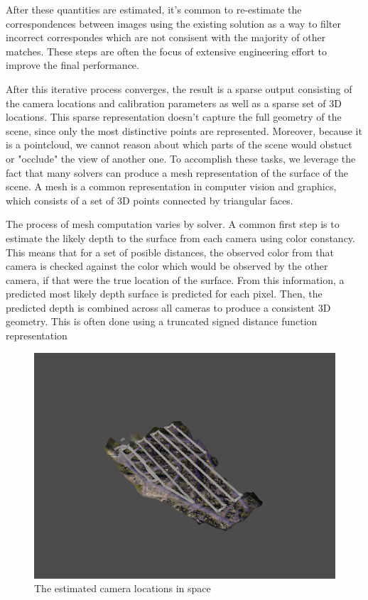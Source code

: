 After these quantities are estimated, it's common to re-estimate the correspondences between images using the existing solution as a way to filter incorrect correspondes which are not consisent with the majority of other matches. These steps are often the focus of extensive engineering effort to improve the final performance. 

After this iterative process converges, the result is a sparse output consisting of the camera locations and calibration parameters as well as a sparse set of 3D locations. This sparse representation doesn't capture the full geometry of the scene, since only the most distinctive points are represented. Moreover, because it is a pointcloud, we cannot reason about which parts of the scene would obstuct or "occlude" the view of another one. To accomplish these tasks, we leverage the fact that many solvers can produce a mesh representation of the surface of the scene. A mesh is a common representation in computer vision and graphics, which consists of a set of 3D points connected by triangular faces. 

The process of mesh computation varies by solver. A common first step is to estimate the likely depth to the surface from each camera using color constancy. This means that for a set of posible distances, the observed color from that camera is checked against the color which would be observed by the other camera, if that were the true location of the surface. From this information, a predicted most likely depth surface is predicted for each pixel. Then, the predicted depth is combined across all cameras to produce a consistent 3D geometry. This is often done using a truncated signed distance function representation \cite{} 

\begin{figure}
    \centering
    \includegraphics[width=\textwidth]{figs/methods/structure_from_motion/camera estimation.png}
    \caption{The estimated camera locations in space}
    \label{fig:camera-locations}
\end{figure}

